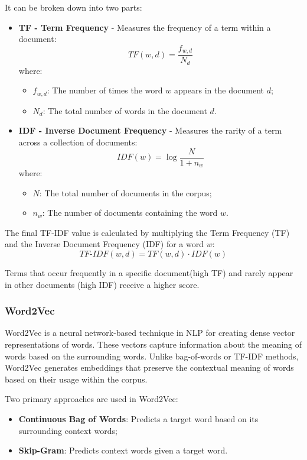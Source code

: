 It can be broken down into two parts:


\begin{itemize}
  \item \textbf{TF - Term Frequency} - Measures the frequency of a term within
    a document:
  \[
  TF(w, d) = \frac{f_{w, d}}{N_d}
  \]
  where:
  \begin{itemize}
    \item \( f_{w, d} \): The number of times the word \( w \) appears in the
      document \( d \);
    \item \( N_d \): The total number of words in the document \( d \).
  \end{itemize}

  \item \textbf{IDF - Inverse Document Frequency} - Measures the rarity of a
    term across a collection of documents:
  \[
  IDF(w) = \log{\frac{N}{1 + n_w}}
  \]
  where:
  \begin{itemize}
    \item \( N \): The total number of documents in the corpus;
    \item \( n_w \): The number of documents containing the word \( w \).
  \end{itemize}
\end{itemize}


The final TF-IDF value is calculated by multiplying the Term Frequency (TF) and
the Inverse Document Frequency (IDF) for a word \( w \):  
\[  
TF\text{-}IDF(w, d) = TF(w, d) \cdot IDF(w)  
\]  

Terms that occur frequently in a specific document(high TF) and rarely appear
in other documents (high IDF) receive a higher score.

\subsubsection*{Word2Vec}

Word2Vec is a neural network-based technique in NLP for creating dense vector
representations of words. These vectors capture information about the meaning
of words based on the surrounding words. Unlike bag-of-words or TF-IDF methods,
Word2Vec generates embeddings that preserve the contextual meaning of words
based on their usage within the corpus.\cite{w2v}

Two primary approaches are used in Word2Vec: 
\begin{itemize} 
  \item \textbf{Continuous Bag of Words}: Predicts a target word based
    on its surrounding context words;
  \item \textbf{Skip-Gram}: Predicts context words given a target word.
\end{itemize}

